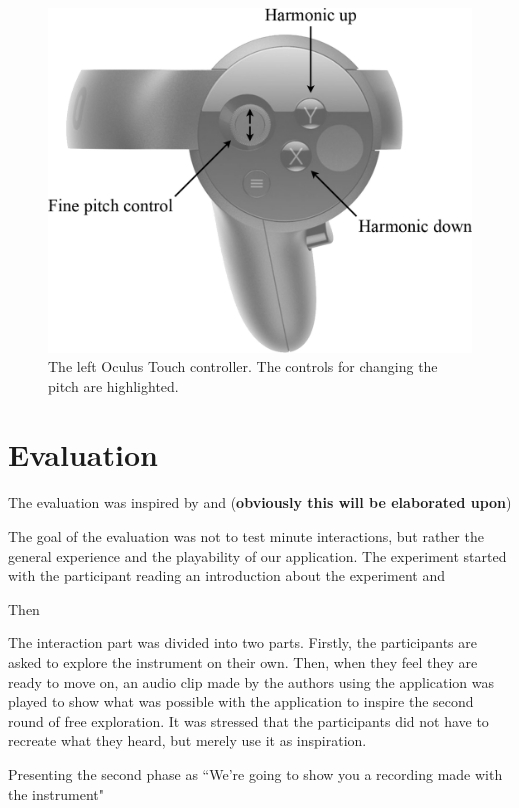 \documentclass{article}
\begin{document}
\begin{figure}[ht]\includegraphics[width=1.0\columnwidth]{SMC 2020 paper template LaTeX/figures/controller.png}
\centering
  \caption{The left Oculus Touch controller. The controls for changing the pitch are highlighted. \label{fig:oculusController}}
\end{figure}

\section{Evaluation}
The evaluation was inspired by \cite{Young2003} \cite{Someren1994} \cite{Stowell2009} and \cite{Finstad2010} (\textbf{obviously this will be elaborated upon})

The goal of the evaluation was not to test minute interactions, but rather the general experience and the playability of our application. The experiment started with the participant reading an introduction about the experiment and 

Then

The interaction part was divided into two parts. Firstly, the participants are asked to explore the instrument on their own. Then, when they feel they are ready to move on, an audio clip made by the authors using the application was played to show what was possible with the application to inspire the second round of free exploration. It was stressed that the participants did not have to recreate what they heard, but merely use it as inspiration. 

Presenting the second phase as ``We're going to show you a recording made with the instrument" 
\end{document}
